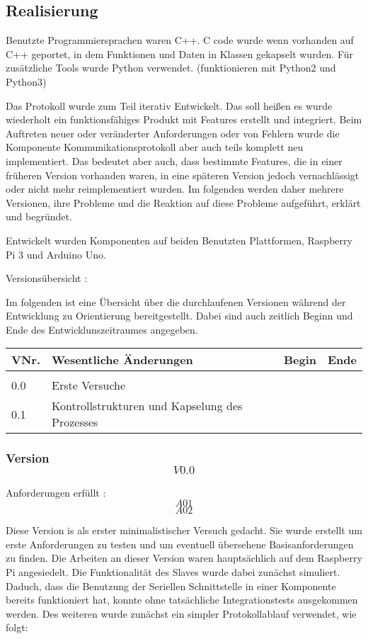 \subsection{Realisierung}

Benutzte Programmiersprachen waren C++. 
C code wurde wenn vorhanden auf C++ geportet, in dem Funktionen und Daten in Klassen gekapselt wurden.
Für zusätzliche Tools wurde Python verwendet. (funktionieren mit Python2 und Python3)

Das Protokoll wurde zum Teil iterativ Entwickelt.
Das soll heißen es wurde wiederholt ein funktionsfähiges Produkt mit Features erstellt und integriert. Beim Auftreten neuer oder veränderter Anforderungen oder von Fehlern wurde die Komponente Kommunikationsprotokoll aber auch teils komplett neu implementiert.
Das bedeutet aber auch, dass bestimmte Features, die in einer früheren Version vorhanden waren, in eine späteren Version jedoch vernachlässigt oder nicht mehr reimplementiert wurden.
Im folgenden werden daher mehrere Versionen, ihre Probleme und die Reaktion auf diese Probleme aufgeführt, erklärt und begründet.

Entwickelt wurden Komponenten auf beiden Benutzten Plattformen, Raspberry Pi 3 und Arduino Uno.

Versionsübersicht : 

Im folgenden ist eine Übersicht über die durchlaufenen Versionen während der Entwicklung zu Orientierung bereitgestellt.
Dabei sind auch zeitlich Beginn und Ende des Entwicklunszeitraumes angegeben.

\begin{tabular}{l l l l}
	VNr. & Wesentliche Änderungen & Begin & Ende \\
	\hline\\
	0.0 & Erste Versuche & & \\
	0.1 & Kontrollstrukturen und Kapselung des Prozesses
\end{tabular}



\subsubsection{Version \[V0.0\]}

Anforderungen erfüllt : \[A01\]\[A02\]

Diese Version is als erster minimalistischer Versuch gedacht. Sie wurde erstellt um erste Anforderungen zu testen und um eventuell übersehene Basisanforderungen zu finden.
Die Arbeiten an dieser Version waren hauptsächlich auf dem Raspberry Pi angesiedelt.
Die Funktionalität des Slaves wurde dabei zunächst simuliert. Daduch, dass die Benutzung der Seriellen Schnittstelle in einer Komponente bereits funktioniert hat, konnte ohne tatsächliche Integrationstests ausgekommen werden.
Des weiteren wurde zunächst ein simpler Protokollablauf verwendet, wie folgt:


